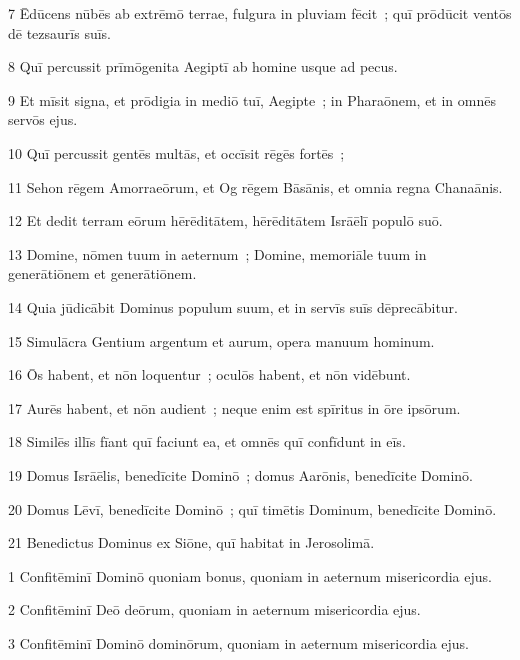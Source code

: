 \psalmVerse
  {\phantom{00}7}
  {Ēdūcens nūbēs ab extrēmō terrae, fulgura in pluviam fēcit~; quī prōdūcit ventōs dē tezsaurīs suīs.}


\psalmVerse
  {\phantom{00}8}
  {Quī percussit prīmōgenita Aegiptī ab homine usque ad pecus.}


\psalmVerse
  {\phantom{00}9}
  {Et mīsit signa, et prōdigia in mediō tuī, Aegipte~; in Pharaōnem, et in omnēs servōs ejus.}


\psalmVerse
  {\phantom{0}10}
  {Quī percussit gentēs multās, et occīsit rēgēs fortēs~;}


\psalmVerse
  {\phantom{0}11}
  {Sehon rēgem Amorraeōrum, et Og rēgem Bāsānis, et omnia regna Chanaānis.}


\psalmVerse
  {\phantom{0}12}
  {Et dedit terram eōrum hērēditātem, hērēditātem Isrāēlī populō suō.}


\psalmVerse
  {\phantom{0}13}
  {Domine, nōmen tuum in aeternum~; Domine, memoriāle tuum in generātiōnem et generātiōnem.}


\psalmVerse
  {\phantom{0}14}
  {Quia jūdicābit Dominus populum suum, et in servīs suīs dēprecābitur.}


\psalmVerse
  {\phantom{0}15}
  {Simulācra Gentium argentum et aurum, opera manuum hominum.}


\psalmVerse
  {\phantom{0}16}
  {Ōs habent, et nōn loquentur~; oculōs habent, et nōn vidēbunt.}


\psalmVerse
  {\phantom{0}17}
  {Aurēs habent, et nōn audient~; neque enim est spīritus in ōre ipsōrum.}


\psalmVerse
  {\phantom{0}18}
  {Similēs illīs fīant quī faciunt ea, et omnēs quī confīdunt in eīs.}


\psalmVerse
  {\phantom{0}19}
  {Domus Isrāēlis, benedīcite Dominō~; domus Aarōnis, benedīcite Dominō.}


\psalmVerse
  {\phantom{0}20}
  {Domus Lēvī, benedīcite Dominō~; quī timētis Dominum, benedīcite Dominō.}


\psalmVerse
  {\phantom{0}21}
  {Benedictus Dominus ex Siōne, quī habitat in Jerosolimā.}



\psalmVerse
  {\phantom{00}1}
  {Confitēminī Dominō quoniam bonus, quoniam in aeternum misericordia ejus.}


\psalmVerse
  {\phantom{00}2}
  {Confitēminī Deō deōrum, quoniam in aeternum misericordia ejus.}


\psalmVerse
  {\phantom{00}3}
  {Confitēminī Dominō dominōrum, quoniam in aeternum misericordia ejus.}


